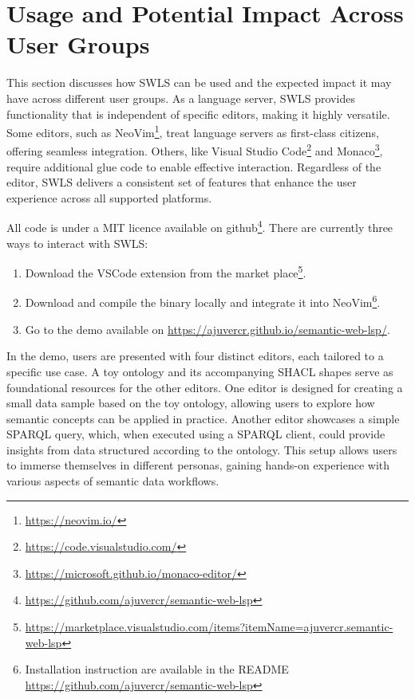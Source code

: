 \section{Usage and Potential Impact Across User Groups}%
\label{sec:usage}

This section discusses how SWLS can be used and the expected impact it may have across different user groups.
As a language server, SWLS provides functionality that is independent of specific editors, making it highly versatile.
Some editors, such as NeoVim\footnote{\url{https://neovim.io/}}, treat language servers as first-class citizens, offering seamless integration.
Others, like Visual Studio Code\footnote{\url{https://code.visualstudio.com/}} and Monaco\footnote{\url{https://microsoft.github.io/monaco-editor/}}, require additional glue code to enable effective interaction.
Regardless of the editor, SWLS delivers a consistent set of features that enhance the user experience across all supported platforms.

All code is under a MIT licence available on github\footnote{\url{https://github.com/ajuvercr/semantic-web-lsp}}.
There are currently three ways to interact with SWLS:
\begin{enumerate}
  \item Download the VSCode extension from the market place\footnote{\url{https://marketplace.visualstudio.com/items?itemName=ajuvercr.semantic-web-lsp}}.
  \item Download and compile the binary locally and integrate it into NeoVim\footnote{Installation instruction are available in the README \url{https://github.com/ajuvercr/semantic-web-lsp}}.
  \item Go to the demo available on \url{https://ajuvercr.github.io/semantic-web-lsp/}.
\end{enumerate}

In the demo, users are presented with four distinct editors, each tailored to a specific use case.
A toy ontology and its accompanying SHACL shapes serve as foundational resources for the other editors.
One editor is designed for creating a small data sample based on the toy ontology, allowing users to explore how semantic concepts can be applied in practice.
Another editor showcases a simple SPARQL query, which, when executed using a SPARQL client, could provide insights from data structured according to the ontology.
This setup allows users to immerse themselves in different personas, gaining hands-on experience with various aspects of semantic data workflows.

